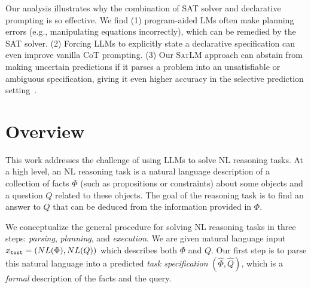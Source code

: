 \documentclass{article}
\theoremstyle{definition}
\newcommand\gd[1]{\todo[color=red!40]{{\bf Greg}: #1}}
\newcommand{\spec}{\Phi}
\newcommand{\query}{Q}
\newcommand{\satlm}{\textsc{SatLM}}
\begin{document}
Our analysis illustrates why the combination of SAT solver and declarative prompting is so effective.
We find (1) program-aided LMs often make planning errors (e.g., manipulating equations incorrectly), which can be remedied by the SAT solver. (2) Forcing LLMs to explicitly state a declarative specification can even improve vanilla CoT prompting. (3) Our \satlm{} approach can abstain from making uncertain predictions if it parses a problem into an unsatisfiable or ambiguous specification, giving it even higher accuracy in the selective prediction setting~\citep{selectivesetting}.




\section{Overview}

This work addresses the challenge of using LLMs to solve NL reasoning tasks. At a high level, an NL reasoning task is a natural language description of a collection of facts $\Phi$ (such as propositions or constraints) about some objects and a question $\query$ related to these objects. The goal of the reasoning task is to find an answer to $\query$ that can be deduced from the information provided in $\Phi$.

We conceptualize the general procedure for solving NL reasoning tasks in three steps: \emph{parsing}, \emph{planning}, and \emph{execution}. We are given natural language input $x_{\tt test} = (NL(\spec), NL(\query))$ which describes both $\spec$ and $\query$. Our first step is to parse this natural language into a predicted \emph{task specification} $(\hat{\spec}, \hat{\query})$, which is a \emph{formal} description of the facts and the query.
\end{document}
